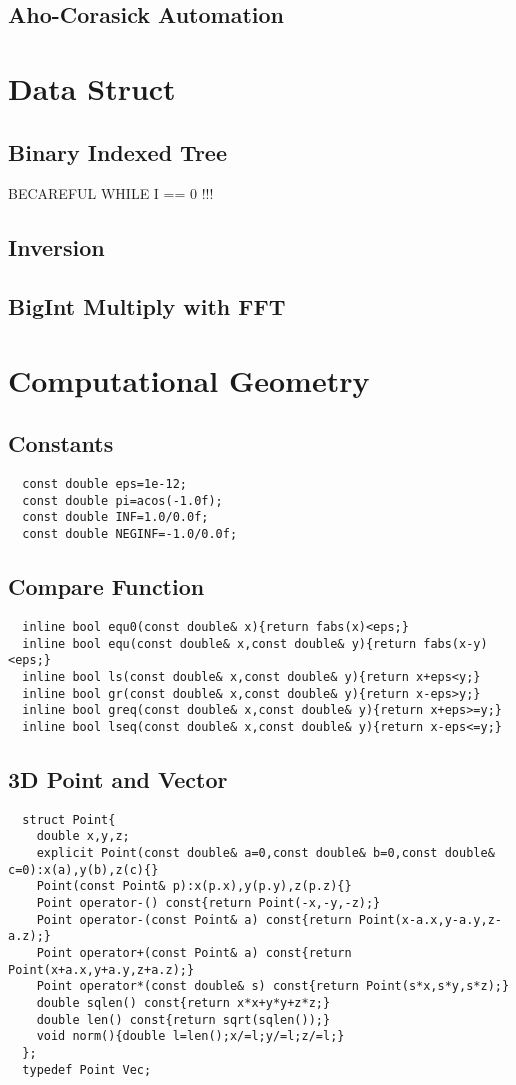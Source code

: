 \documentclass[a4paper]{article}
\begin{document}
\subsection {Aho-Corasick Automation}

\section{Data Struct}
\subsection {Binary Indexed Tree}
BECAREFUL WHILE I == 0 !!!

\subsection {Inversion}

\subsection {BigInt Multiply with FFT}

\section{Computational Geometry}
\subsection{Constants}
\begin{lstlisting}
  const double eps=1e-12;
  const double pi=acos(-1.0f);
  const double INF=1.0/0.0f;
  const double NEGINF=-1.0/0.0f;
\end{lstlisting}
\subsection{Compare Function}
\begin{lstlisting}
  inline bool equ0(const double& x){return fabs(x)<eps;}
  inline bool equ(const double& x,const double& y){return fabs(x-y)<eps;}
  inline bool ls(const double& x,const double& y){return x+eps<y;}
  inline bool gr(const double& x,const double& y){return x-eps>y;}
  inline bool greq(const double& x,const double& y){return x+eps>=y;}
  inline bool lseq(const double& x,const double& y){return x-eps<=y;}
\end{lstlisting}
\subsection{3D Point and Vector}
\begin{lstlisting}
  struct Point{
    double x,y,z;
    explicit Point(const double& a=0,const double& b=0,const double& c=0):x(a),y(b),z(c){}
    Point(const Point& p):x(p.x),y(p.y),z(p.z){}
    Point operator-() const{return Point(-x,-y,-z);}
    Point operator-(const Point& a) const{return Point(x-a.x,y-a.y,z-a.z);}
    Point operator+(const Point& a) const{return Point(x+a.x,y+a.y,z+a.z);}
    Point operator*(const double& s) const{return Point(s*x,s*y,s*z);}
    double sqlen() const{return x*x+y*y+z*z;}
    double len() const{return sqrt(sqlen());}
    void norm(){double l=len();x/=l;y/=l;z/=l;}
  };
  typedef Point Vec;
\end{lstlisting}
\end{document}
